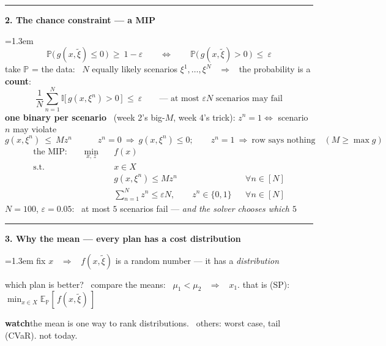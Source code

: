 \documentclass[10pt]{article}
\newcommand{\beat}[2]{%
  \par\medskip\needspace{8\baselineskip}%
  {\color{ruleink}\rule{\textwidth}{1pt}}\par\nobreak\vspace{2pt}
  {\large\bfseries #1.\; #2}\par\nobreak\vspace{3pt}}
\newenvironment{board}{%
  \par\vspace{2pt}
  \begingroup\leftskip=1.3em\relax}{%
  \par\endgroup\vspace{2pt}}
\newcommand{\watch}[1]{\par{\color{watchink}\small\textbf{watch}\quad #1}\par}
\begin{document}
\beat{2}{The chance constraint --- a MIP}
\begin{board}
\[
  \mathbb{P}\bigl(\, g(x, \tilde{\xi}) \le 0 \,\bigr) \ \ge\ 1 - \varepsilon
  \qquad\Longleftrightarrow\qquad
  \mathbb{P}\bigl(\, g(x, \tilde{\xi}) > 0 \,\bigr) \ \le\ \varepsilon
\]
take $\mathbb{P}$ = the data: \ $N$ equally likely scenarios $\xi^1, \dots, \xi^N$ \ $\Rightarrow$ \ the probability is a \textbf{count}:
\[
  \frac{1}{N} \sum_{n=1}^{N} \mathbb{I}\bigl[\, g(x, \xi^n) > 0 \,\bigr] \ \le\ \varepsilon
  \qquad \text{--- at most $\varepsilon N$ scenarios may fail}
\]
\textbf{one binary per scenario} \ (week 2's big-$M$, week 4's trick): \quad $z^n = 1 \iff$ scenario $n$ may violate
\[
  g(x, \xi^n) \ \le\ M z^n
  \qquad\quad z^n = 0 \ \Rightarrow \ g(x, \xi^n) \le 0; \qquad z^n = 1 \ \Rightarrow \ \text{row says nothing} \quad (M \ge \max g)
\]
\[
\begin{aligned}
  \text{the MIP:}\qquad \min_{x,\, z}\quad & f(x) \\
  \text{s.t.}\quad & x \in X \\
                   & g(x, \xi^n) \le M z^n && \forall n \in [N] \\
                   & \textstyle\sum_{n=1}^{N} z^n \le \varepsilon N, \qquad z^n \in \{0,1\} && \forall n \in [N]
\end{aligned}
\]
$N = 100$, $\varepsilon = 0.05$: \ at most $5$ scenarios fail --- \emph{and the solver chooses which $5$}
\end{board}

\beat{3}{Why the mean --- every plan has a cost distribution}
\begin{board}
fix $x$ \ $\Rightarrow$ \ $f(x, \tilde{\xi})$ is a random number --- it has a \emph{distribution}
\begin{center}
\end{center}
which plan is better? \ compare the means: \ $\mu_1 < \mu_2$ \ $\Rightarrow$ \ $x_1$. \qquad that is (SP): \ $\min_{x \in X} \mathbb{E}_{\mathbb{P}}[\, f(x, \tilde{\xi}) \,]$
\end{board}
\watch{the mean is one way to rank distributions. \ others: worst case, tail (CVaR). not today.}
\end{document}

